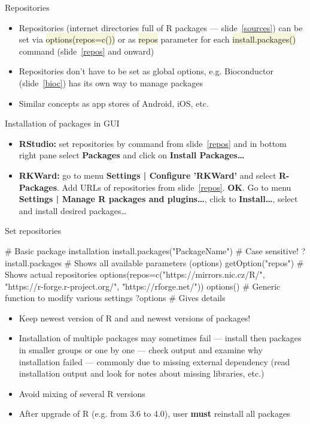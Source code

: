 \documentclass[compress, ucs, xelatex, 11pt, xcolor=svgnames, aspectratio=169,
	hyperref={
		bookmarks=true,
		unicode=true,
		colorlinks=true,
		pdftitle={Molecular data in R},
		plainpages=false,
		pdfauthor={Vojtech Zeisek},
		pdfsubject={Course about phylogeny and evolution in R},
		pdfcreator={XeLaTeX},
		pdfkeywords={R, evolution, phylogeny, molecular data},
		linkcolor=Crimson, %
		anchorcolor=Magenta, %
		citecolor=Magenta, %
		filecolor=Magenta, %
		menucolor=Magenta, %
		urlcolor=DodgerBlue, %
		pdftex},
	url={hyphens, lowtilde} %
	]{beamer}
\renewcommand{\texttt}[1]{\colorbox{Beige}{{\ttfamily #1}}}
\begin{document}
\begin{frame}{Repositories}
	\begin{itemize}
		\item Repositories (internet directories full of R packages --- slide~\ref{sources}) can be set via \texttt{options(repos=c())} or as \texttt{repos} parameter for each \texttt{install.packages()} command (slide~\ref{repos} and onward)
		\item Repositories don't have to be set as global options, e.g. Bioconductor (slide~\ref{bioc}) has its own way to manage packages
		\item Similar concepts as app stores of Android, iOS, etc.
	\end{itemize}
	\begin{block}{Installation of packages in GUI}
		\begin{itemize}
			\item \textbf{RStudio:} set repositories by command from slide~\ref{repos} and in bottom right pane select \textbf{Packages} and click on \textbf{Install Packages\ldots}
			\item \textbf{RKWard:} go to menu \textbf{Settings | Configure 'RKWard'} and select \textbf{R-Packages}. Add URLs of repositories from slide~\ref{repos}. \textbf{OK}. Go to menu \textbf{Settings | Manage R packages and plugins\ldots}, click to \textbf{Install\ldots}, select and install desired packages\ldots
		\end{itemize}
	\end{block}
\end{frame}

\begin{frame}[fragile]{Set repositories}
	\label{repos}
	\begin{spluscode}
    # Basic package installation
    install.packages("PackageName") # Case sensitive!
    ?install.packages # Shows all available parameters (options)
    getOption("repos") # Shows actual repositories
    options(repos=c("https://mirrors.nic.cz/R/",
      "https://r-forge.r-project.org/", "https://rforge.net/"))
    options() # Generic function to modify various settings
    ?options # Gives details
	\end{spluscode}
	\begin{itemize}
		\item \alert{Keep newest version of R and and newest versions of packages!}
		\item Installation of multiple packages may sometimes fail --- install then packages in smaller groups or one by one --- check output and examine why installation failed --- commonly due to missing external dependency (read installation output and look for notes about missing libraries, etc.)
		\item Avoid mixing of several R versions
		\item After upgrade of R (e.g. from 3.6 to 4.0), user \textbf{must} reinstall all packages
	\end{itemize}
\end{frame}
\end{document}
